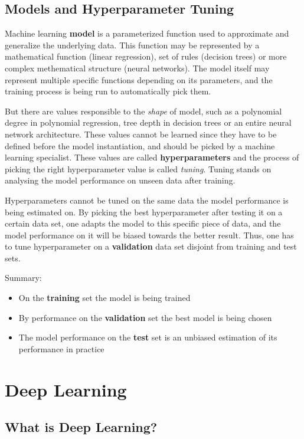 \documentclass[thesis=B,english]{FITthesis}[2019/12/23]
\begin{document}
	\subsection{Models and Hyperparameter Tuning}
	
	Machine learning \textbf{model} is a parameterized function used to approximate and generalize the underlying data. This function may be represented by a mathematical function (linear regression), set of rules (decision trees) or more complex methematical structure (neural networks). The model itself may represent multiple specific functions depending on its parameters, and the training process is being run to automatically pick them.
	
	But there are values responsible to the \textit{shape} of model, such as a polynomial degree in polynomial regression, tree depth in decision trees or an entire neural network architecture. These values cannot be learned since they have to be defined before the model instantiation, and should be picked by a machine learning specialist. These values are called \textbf{hyperparameters} and the process of picking the right hyperparameter value is called \textit{tuning}. Tuning stands on analysing the model performance on unseen data after training.
	
	Hyperparameters cannot be tuned on the same data the model performance is being estimated on. By picking the best hyperparameter after testing it on a certain data set, one adapts the model to this specific piece of data, and the model performance on it will be biased towards the better result. Thus, one has to tune hyperparameter on a \textbf{validation} data set disjoint from training and test sets.
	
	Summary:
	\begin{itemize}
		\item On the \textbf{training} set the model is being trained
		\item By performance on the \textbf{validation} set the best model is being chosen
		\item The model performance on the \textbf{test} set is an unbiased estimation of its performance in practice
	\end{itemize}
	
	\section{Deep Learning}
	
	\subsection{What is Deep Learning?}
	
\end{document}
